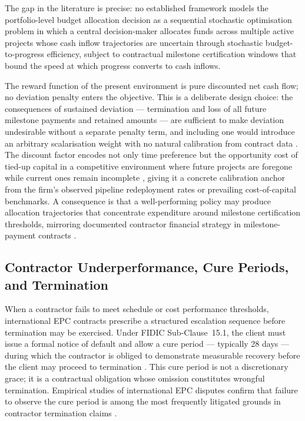 The gap in the literature is precise: no established framework models
the portfolio-level budget allocation decision as a sequential
stochastic optimisation problem in which a central decision-maker
allocates funds across multiple active projects whose cash inflow
trajectories are uncertain through stochastic budget-to-progress
efficiency, subject to contractual milestone certification windows
that bound the speed at which progress converts to cash inflows.

The reward function of the present environment is pure discounted net
cash flow; no deviation penalty enters the objective. This is a
deliberate design choice: the consequences of sustained deviation ---
termination and loss of all future milestone payments and retained
amounts --- are sufficient to make deviation undesirable without a
separate penalty term, and including one would introduce an arbitrary
scalarisation weight with no natural calibration from contract data
\citep{Ng1999}. The discount factor encodes not only time preference
but the opportunity cost of tied-up capital in a competitive
environment where future projects are foregone while current ones
remain incomplete \citep{Damodaran2012}, giving it a concrete
calibration anchor from the firm's observed pipeline redeployment
rates or prevailing cost-of-capital benchmarks. A consequence is that
a well-performing policy may produce allocation trajectories that
concentrate expenditure around milestone certification thresholds,
mirroring documented contractor financial strategy in
milestone-payment contracts \citep{Kenley2009, Kaka1993, Arditi2005}.

\subsection{Contractor Underperformance, Cure Periods, and Termination}
\label{subsec:lr_interventions}

When a contractor fails to meet schedule or cost performance
thresholds, international EPC contracts prescribe a structured
escalation sequence before termination may be exercised. Under FIDIC
Sub-Clause~15.1, the client must issue a formal notice of default and
allow a cure period --- typically 28 days --- during which the
contractor is obliged to demonstrate measurable recovery before the
client may proceed to termination \citep{FIDIC2017, Ndekugri2008}.
This cure period is not a discretionary grace; it is a contractual
obligation whose omission constitutes wrongful termination. Empirical
studies of international EPC disputes confirm that failure to observe
the cure period is among the most frequently litigated grounds in
contractor termination claims \citep{Ndekugri2008, Ennis2021}.

